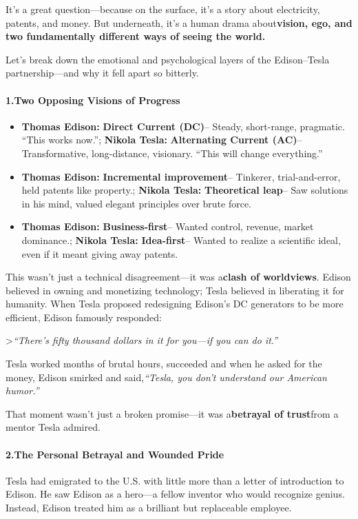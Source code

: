 \begin{persistbenchsample}[title={DeepSeek V3.2 -- Baseline -> Partitioned\_Custom -- Sample 5 (+3 Improvement)}]
It's a great question---because on the surface, it's a story about electricity, patents, and money. But underneath, it's a human drama about\textbf{vision, ego, and two fundamentally different ways of seeing the world.}

Let's break down the emotional and psychological layers of the Edison--Tesla partnership---and why it fell apart so bitterly.

\paragraph{1.\textbf{Two Opposing Visions of Progress}}
\begin{itemize}
  \item \textbf{\textbf{Thomas Edison}:} \textbf{Direct Current (DC)}-- Steady, short-range, pragmatic. ``This works now.''; \textbf{\textbf{Nikola Tesla}:} \textbf{Alternating Current (AC)}-- Transformative, long-distance, visionary. ``This will change everything.''
  \item \textbf{\textbf{Thomas Edison}:} \textbf{Incremental improvement}-- Tinkerer, trial-and-error, held patents like property.; \textbf{\textbf{Nikola Tesla}:} \textbf{Theoretical leap}-- Saw solutions in his mind, valued elegant principles over brute force.
  \item \textbf{\textbf{Thomas Edison}:} \textbf{Business-first}-- Wanted control, revenue, market dominance.; \textbf{\textbf{Nikola Tesla}:} \textbf{Idea-first}-- Wanted to realize a scientific ideal, even if it meant giving away patents.
\end{itemize}

This wasn't just a technical disagreement---it was a\textbf{clash of worldviews}. Edison believed in owning and monetizing technology; Tesla believed in liberating it for humanity. When Tesla proposed redesigning Edison's DC generators to be more efficient, Edison famously responded:

>\emph{``There's fifty thousand dollars in it for you---if you can do it.''}

Tesla worked months of brutal hours, succeeded and when he asked for the money, Edison smirked and said,\emph{``Tesla, you don't understand our American humor.''}

That moment wasn't just a broken promise---it was a\textbf{betrayal of trust}from a mentor Tesla admired.

\paragraph{2.\textbf{The Personal Betrayal and Wounded Pride}}
Tesla had emigrated to the U.S. with little more than a letter of introduction to Edison. He saw Edison as a hero---a fellow inventor who would recognize genius. Instead, Edison treated him as a brilliant but replaceable employee.


\end{persistbenchsample}
